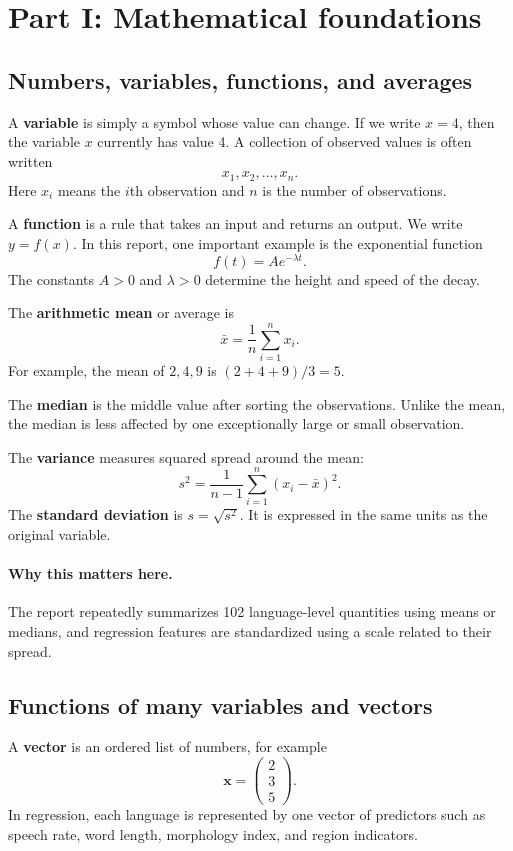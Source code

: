 \documentclass[11pt]{article}
\begin{document}
\newpage
\section{Part I: Mathematical foundations}

\subsection{Numbers, variables, functions, and averages}
A \textbf{variable} is simply a symbol whose value can change. If we write $x=4$, then the variable $x$ currently has value 4. A collection of observed values is often written
\[
x_1,x_2,\ldots,x_n.
\]
Here $x_i$ means the $i$th observation and $n$ is the number of observations.

A \textbf{function} is a rule that takes an input and returns an output. We write $y=f(x)$. In this report, one important example is the exponential function
\[
f(t)=Ae^{-\lambda t}.
\]
The constants $A>0$ and $\lambda>0$ determine the height and speed of the decay.

The \textbf{arithmetic mean} or average is
\[
\bar x=\frac{1}{n}\sum_{i=1}^n x_i.
\]
For example, the mean of $2,4,9$ is $(2+4+9)/3=5$.

The \textbf{median} is the middle value after sorting the observations. Unlike the mean, the median is less affected by one exceptionally large or small observation.

The \textbf{variance} measures squared spread around the mean:
\[
s^2=\frac{1}{n-1}\sum_{i=1}^n(x_i-\bar x)^2.
\]
The \textbf{standard deviation} is $s=\sqrt{s^2}$. It is expressed in the same units as the original variable.

\paragraph{Why this matters here.}
The report repeatedly summarizes 102 language-level quantities using means or medians, and regression features are standardized using a scale related to their spread.

\subsection{Functions of many variables and vectors}
A \textbf{vector} is an ordered list of numbers, for example
\[
\mathbf x=
\begin{pmatrix}
2\\3\\5
\end{pmatrix}.
\]
In regression, each language is represented by one vector of predictors such as speech rate, word length, morphology index, and region indicators.
\end{document}
